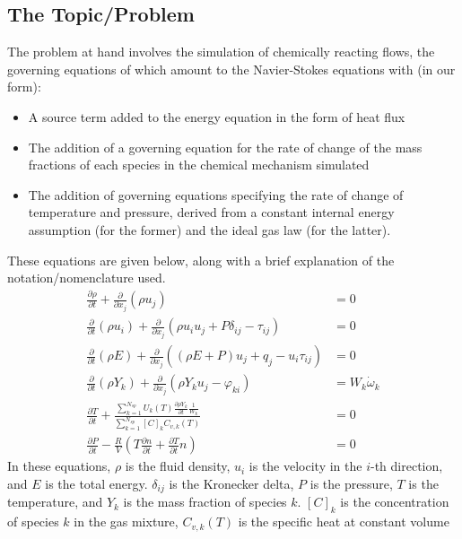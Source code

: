 \subsection{The Topic/Problem}

The problem at hand involves the simulation of chemically reacting flows, the
governing equations of which amount to the Navier-Stokes equations with (in
our form):
\begin{itemize}
\item{A source term added to the energy equation in the form of heat flux}
\item{The addition of a governing equation for the rate of change of the
      mass fractions of each species in the chemical mechanism simulated}
\item{The addition of governing equations specifying the rate of change of
      temperature and pressure, derived from a constant internal energy
      assumption (for the former) and the ideal gas law (for the latter).}
\end{itemize}
These equations are given below, along with a brief explanation of the notation/nomenclature
used.
\begin{align}
\frac{\partial \rho}{\partial t} + \frac{\partial}{\partial x_{j}}(\rho u_{j}) &= 0 \\
\frac{\partial}{\partial t}(\rho u_{i}) + \frac{\partial}{\partial x_{j}}(\rho u_{i} u_{j} + P\delta_{ij} - \tau_{ij}) &= 0 \\
\frac{\partial}{\partial t}(\rho E) + \frac{\partial}{\partial x_{j}}((\rho E + P)u_{j} + q_{j} - u_{i}\tau_{ij}) &= 0 \\
\frac{\partial}{\partial t}(\rho Y_{k}) + \frac{\partial}{\partial x_{j}}(\rho Y_{k} u_{j} - \varphi_{ki}) &= W_{k}\dot{\omega}_{k} \\
\frac{\partial T}{\partial t} + \frac{\sum_{k=1}^{N_{sp}}U_{k}(T)\frac{\partial \rho Y_{k}}{\partial t}\frac{1}{W_{k}}}{\sum_{k=1}^{N_{sp}}[C]_{k}C_{v,k}(T)} &= 0 \\
\frac{\partial P}{\partial t} - \frac{R}{V}(T\frac{\partial n}{\partial t} + \frac{\partial T}{\partial t}n) &= 0
\end{align}
In these equations, $\rho$ is the fluid density, $u_{i}$ is the velocity in the $i$-th direction, and $E$ is the total energy.
$\delta_{ij}$ is the Kronecker delta, $P$ is the pressure, $T$ is the temperature, and $Y_{k}$ is the mass fraction of
species $k$. $[C]_{k}$ is the concentration of species $k$ in the gas mixture, $C_{v,k}(T)$ is the specific heat at constant volume
